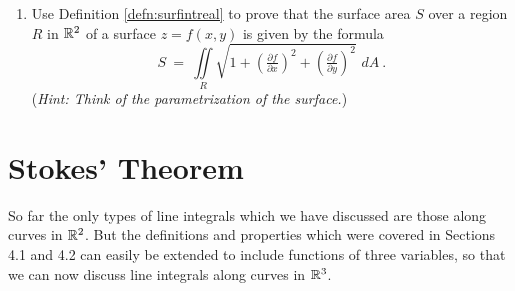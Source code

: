 \begin{enumerate}[\bfseries 1.]
 Show that the surface area $S$ of the ellipsoid is
 \begin{displaymath}
  S ~=~ \int_0^{\pi} \int_0^{2\pi} \sin\phi \sqrt{a^2 b^2 \cos^2 \phi + c^2 (a^2 \sin^2 \theta + b^2 \cos^2 \theta )
  \sin^2 \phi} \,\,d\theta\,d\phi~.
 \end{displaymath}
 (Note: The above double integral can not be evaluated by elementary means. For specific values of $a$, $b$ and
 $c$ it can be evaluated using numerical methods. An alternative is to express the surface area in terms of
 \emph{elliptic integrals}.)
[{[\bfseries 1.]}]
 \item Use Definition \ref{defn:surfintreal} to prove that the surface area $S$ over a region $R$ in $\mathbb{R}^{2}$
  of a surface $z=f(x,y)$ is given by the formula
  \begin{displaymath}
   S ~=~ \iint\limits_R \sqrt{1 + \left( \tfrac{\partial f}{\partial x} \right)^2 +
   \left( \tfrac{\partial f}{\partial y} \right)^2} \,\,dA ~.
  \end{displaymath}
  (\emph{Hint: Think of the parametrization of the surface.})
\end{enumerate}
\newpage
\section{Stokes' Theorem}
So far the only types of line integrals which we have discussed are those along curves in $\mathbb{R}^{2}$. But the
definitions and properties which were covered in Sections 4.1 and 4.2 can easily be extended to include
functions of three variables, so that we can now discuss line integrals along curves in $\mathbb{R}^{3}$.


